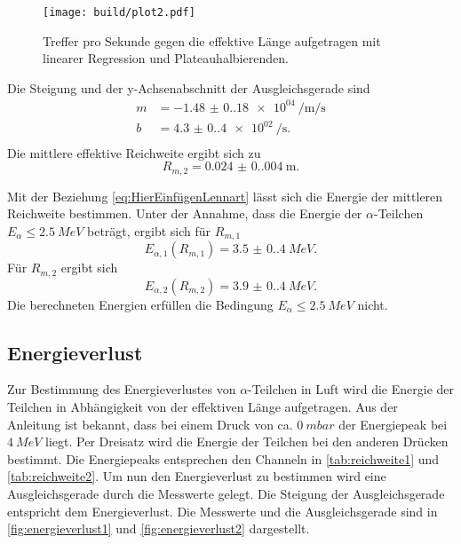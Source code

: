 \begin{figure}[H]
  \centering
  \texttt{[image: build/plot2.pdf]}
  \caption{Treffer pro Sekunde gegen die effektive Länge aufgetragen mit linearer Regression und Plateauhalbierenden.}
  \label{fig:reichweite2}
\end{figure}

Die Steigung und der y-Achsenabschnitt der Ausgleichsgerade sind
\begin{align*}
  m &= \SI{-1.48(0.18)e04}{\per\meter\per\second} \\
  b &= \SI{4.3(0.4)e02}{\per\second}.\\
\end{align*}
Die mittlere effektive Reichweite ergibt sich zu
\begin{equation*}
  R_{m,2} = \SI{0.024(0.004)}{\meter}.
\end{equation*}

Mit der Beziehung \eqref{eq:HierEinfügenLennart} lässt sich die Energie der mittleren Reichweite bestimmen.
Unter der Annahme, dass die Energie der $\alpha$-Teilchen $E_\alpha \leq \SI{2.5}{MeV}$ beträgt, ergibt sich für $R_{m,1}$
\begin{equation*}
  E_{\alpha,1}\left(R_{m,1}\right) = \SI{3.5(0.4)}{MeV}.
\end{equation*}
Für $R_{m,2}$ ergibt sich
\begin{equation*}
  E_{\alpha,2}\left(R_{m,2}\right) = \SI{3.9(0.4)}{MeV}.
\end{equation*}
Die berechneten Energien erfüllen die Bedingung $E_\alpha \leq \SI{2.5}{MeV}$ nicht.

\subsection{Energieverlust}
\label{sec:energieverlust}

Zur Bestimmung des Energieverlustes von $\alpha$-Teilchen in Luft wird die Energie der Teilchen in Abhängigkeit von der effektiven Länge aufgetragen.
Aus der Anleitung ist bekannt, dass bei einem Druck von ca. $\SI{0}{mbar}$ der Energiepeak bei $\SI{4}{MeV}$ liegt.
Per Dreisatz wird die Energie der Teilchen bei den anderen Drücken bestimmt. 
Die Energiepeaks entsprechen den Channeln in \autoref{tab:reichweite1} und \autoref{tab:reichweite2}.
Um nun den Energieverlust zu bestimmen wird eine Ausgleichsgerade durch die Messwerte gelegt.
Die Steigung der Ausgleichsgerade entspricht dem Energieverlust.
Die Messwerte und die Ausgleichsgerade sind in \autoref{fig:energieverlust1} und \autoref{fig:energieverlust2} dargestellt.

